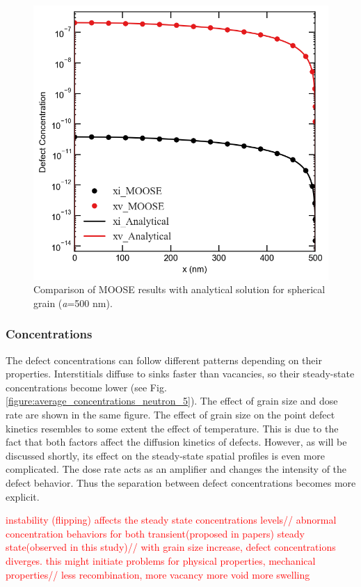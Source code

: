 \documentclass[utf8]{frontiersSCNS} %
\begin{document}
    \begin{figure}[h!]
        \centering
        \includegraphics[scale=0.55]{concentration_profiles_MOOSE_Analytical_Neutron_0}
        \caption{Comparison of MOOSE results with analytical solution for spherical grain (\textit{a}=500 nm).}
        \label{figure:concentrations_MOOSE_analytical}
    \end{figure}

 \subsubsection{Concentrations}
    The defect concentrations can follow different patterns depending on their properties. Interstitials diffuse to sinks faster than vacancies, so their steady-state concentrations become lower (see Fig. \ref{figure:average_concentrations_neutron_5}). The effect of grain size and dose rate are shown in the same figure. The effect of grain size on the point defect kinetics resembles to some extent the effect of temperature. This is due to the fact that both factors affect the diffusion kinetics of defects. However, as will be discussed shortly, its effect on the steady-state spatial profiles is even more complicated. The dose rate acts as an amplifier and changes the intensity of the defect behavior. Thus the separation between defect concentrations becomes more explicit.

\textcolor{red}{
instability (flipping) affects the steady state concentrations levels//
abnormal concentration behaviors for both transient(proposed in papers) steady state(observed in this study)//
with grain size increase, defect concentrations diverges. this might initiate problems for physical properties, mechanical properties//
less recombination, more vacancy more void more swelling
}
\end{document}
